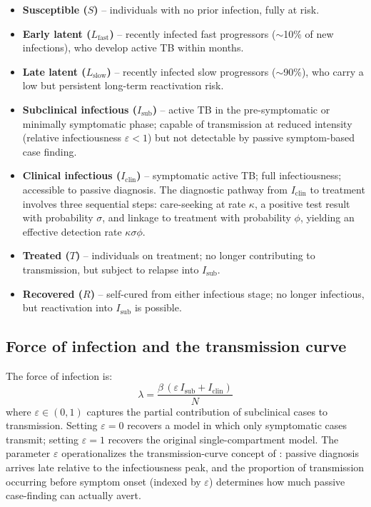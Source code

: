 \documentclass[11pt]{article}
\begin{document}
\begin{itemize}
  \item \textbf{Susceptible ($S$)} -- individuals with no prior infection, fully at risk.
  \item \textbf{Early latent ($L_\text{fast}$)} -- recently infected fast progressors ($\sim$10\% of new infections), who develop active TB within months.
  \item \textbf{Late latent ($L_\text{slow}$)} -- recently infected slow progressors ($\sim$90\%), who carry a low but persistent long-term reactivation risk.
  \item \textbf{Subclinical infectious ($I_\text{sub}$)} -- active TB in the pre-symptomatic or minimally symptomatic phase; capable of transmission at reduced intensity (relative infectiousness $\varepsilon < 1$) but not detectable by passive symptom-based case finding.
  \item \textbf{Clinical infectious ($I_\text{clin}$)} -- symptomatic active TB; full infectiousness; accessible to passive diagnosis. The diagnostic pathway from $I_\text{clin}$ to treatment involves three sequential steps: care-seeking at rate $\kappa$, a positive test result with probability $\sigma$, and linkage to treatment with probability $\phi$, yielding an effective detection rate $\kappa\sigma\phi$.
  \item \textbf{Treated ($T$)} -- individuals on treatment; no longer contributing to transmission, but subject to relapse into $I_\text{sub}$.
  \item \textbf{Recovered ($R$)} -- self-cured from either infectious stage; no longer infectious, but reactivation into $I_\text{sub}$ is possible.
\end{itemize}

\subsection{Force of infection and the transmission curve}

The force of infection is:
\[
  \lambda = \frac{\beta\,(\varepsilon\, I_\text{sub} + I_\text{clin})}{N}
\]
where $\varepsilon \in (0,1)$ captures the partial contribution of subclinical cases to transmission. Setting $\varepsilon = 0$ recovers a model in which only symptomatic cases transmit; setting $\varepsilon = 1$ recovers the original single-compartment model. The parameter $\varepsilon$ operationalizes the transmission-curve concept of \citet{zwerling2015modelling}: passive diagnosis arrives late relative to the infectiousness peak, and the proportion of transmission occurring before symptom onset (indexed by $\varepsilon$) determines how much passive case-finding can actually avert.
\end{document}

